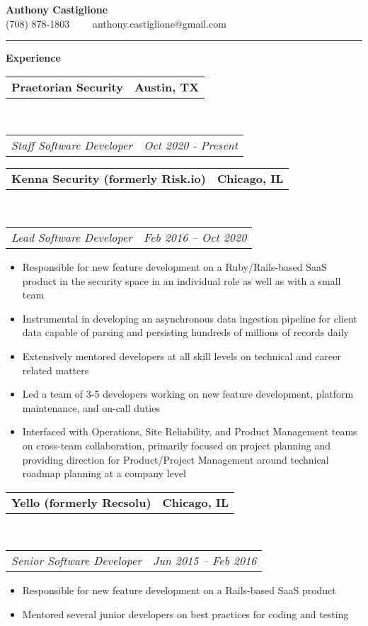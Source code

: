 \documentclass[10pt,letterpaper]{article}
\makeatletter
\newcommand{\headerrow}[2]
{\begin{tabular*}{\linewidth}{l@{\extracolsep{\fill}}r}
	#1 &
	#2 \\
\end{tabular*}}
\newenvironment{indentsection}[1]%
{\begin{list}{}%
	{\setlength{\leftmargin}{#1}}%
	\item[]%
}
{\end{list}}
\makeatother
\begin{document}
\begin{center}
{\LARGE \textbf {Anthony Castiglione}} \\ (708) 878-1803 \ \ \textbullet \ \ anthony.castiglione@gmail.com
	\end{center}
\hrule
\vspace{0.2in}
{\large \textbf{Experience}}

\begin{indentsection}{\parindent}
	\headerrow
		{\textbf{Praetorian Security} }
		{\textbf{Austin, TX}}
	\\
	\headerrow
		{\emph{Staff Software Developer}}
		{\emph{Oct 2020 - Present}}

	\headerrow
		{\textbf{Kenna Security (formerly Risk.io)} }
		{\textbf{Chicago, IL}}
	\\
	\headerrow
		{\emph{Lead Software Developer}}
		{\emph{Feb 2016 -- Oct 2020}}

	\begin{itemize}
	\renewcommand{\labelitemi}{$-$}
	\vspace{-0.1in}
    \item Responsible for new feature development on a Ruby/Rails-based SaaS product in the security space in an individual role as well as with a small team
    \item Instrumental in developing an asynchronous data ingestion pipeline for client data capable of parsing and persisting hundreds of millions of records daily
    \item Extensively mentored developers at all skill levels on technical and career related matters
    \item Led a team of 3-5 developers working on new feature development, platform maintenance, and on-call duties
    \item Interfaced with Operations, Site Reliability, and Product Management teams on cross-team collaboration, primarily focused on project planning and providing direction for Product/Project Management around technical roadmap planning at a company level
	\end{itemize}
\end{indentsection}

\begin{indentsection}{\parindent}
	\headerrow
		{\textbf{Yello (formerly Recsolu)} }
		{\textbf{Chicago, IL}}
	\\
	\headerrow
		{\emph{Senior Software Developer}}
		{\emph{Jun 2015 -- Feb 2016}}

	\begin{itemize}
	\renewcommand{\labelitemi}{$-$}
	\vspace{-0.1in}
    \item Responsible for new feature development on a Rails-based SaaS product
    \item Mentored several junior developers on best practices for coding and testing
	\end{itemize}
\end{indentsection}
\end{document}
